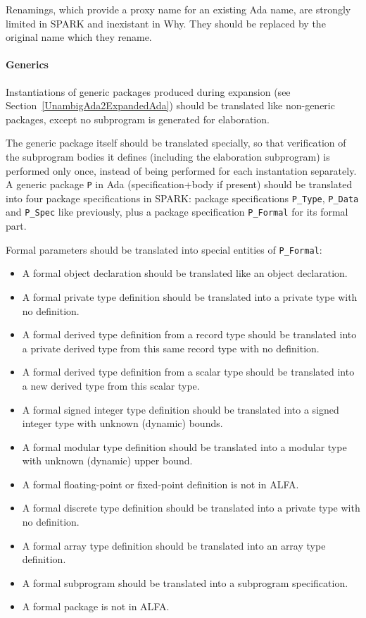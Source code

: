 \documentclass{article}
\begin{document}
Renamings, which provide a proxy name for an existing Ada name, are strongly
limited in SPARK and inexistant in Why. They should be replaced by the original
name which they rename.

\paragraph{Generics}

Instantiations of generic packages produced during expansion (see
Section~\ref{UnambigAda2ExpandedAda}) should be translated like non-generic
packages, except no subprogram is generated for elaboration.

The generic package itself should be translated specially, so that verification
of the subprogram bodies it defines (including the elaboration subprogram) is
performed only once, instead of being performed for each instantation
separately. A generic package \verb|P| in Ada (specification+body if present)
should be translated into four package specifications in SPARK: package
specifications \verb|P_Type|, \verb|P_Data| and \verb|P_Spec| like previously,
plus a package specification \verb|P_Formal| for its formal part.

Formal parameters should be translated into special entities of
\verb|P_Formal|:
\begin{itemize}
\item A formal object declaration should be translated like an object
  declaration.
\item A formal private type definition should be translated into a private type
  with no definition.
\item A formal derived type definition from a record type should be translated
  into a private derived type from this same record type with no definition.
\item A formal derived type definition from a scalar type should be translated
  into a new derived type from this scalar type.
\item A formal signed integer type definition should be translated into a
  signed integer type with unknown (dynamic) bounds.
\item A formal modular type definition should be translated into a modular type
  with unknown (dynamic) upper bound.
\item A formal floating-point or fixed-point definition is not in ALFA.
\item A formal discrete type definition should be translated into a private
  type with no definition.
\item A formal array type definition should be translated into an array type
  definition.
\item A formal subprogram should be translated into a subprogram specification.
\item A formal package is not in ALFA.
\end{itemize}
\end{document}
